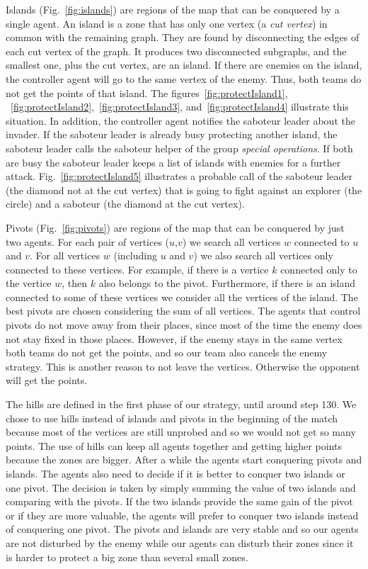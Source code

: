 Islands (Fig.~\ref{fig:islands}) are regions of the map that can be conquered by a single agent. An island is a zone that has only one vertex (a \emph{cut vertex}) in common with the remaining graph. They are found by disconnecting the edges of each cut vertex of the graph. It produces two disconnected subgraphs, and the smallest one, plus the cut vertex, are an island. If there are enemies on the island, the controller agent will go to the same vertex of the enemy. Thus, both teams do not get the points of that island. The figures~\ref{fig:protectIsland1}, ~\ref{fig:protectIsland2},~\ref{fig:protectIsland3}, and~\ref{fig:protectIsland4} illustrate this situation. In addition, the controller agent notifies the saboteur leader about the invader. If the saboteur leader is already busy protecting another island, the saboteur leader calls the saboteur helper of the group \emph{special operations}. If both are busy the saboteur leader keeps a list of islands with enemies for a further attack. Fig.~\ref{fig:protectIsland5} illustrates a probable call of the saboteur leader (the diamond not at the cut vertex) that is going to fight against an explorer (the circle) and a saboteur (the diamond at the cut vertex).

Pivots (Fig.~\ref{fig:pivots}) are regions of the map that can be conquered by just two agents. For each pair of vertices ($u$,$v$) we search all vertices $w$ connected to $u$ and $v$. For all vertices $w$ (including $u$ and $v$) we also search all vertices only connected to these vertices. For example, if there is a vertice $k$ connected only to the vertice $w$, then $k$ also belongs to the pivot. Furthermore, if there is an island connected to some of these vertices we consider all the vertices of the island. The best pivots are chosen considering the sum of all vertices. The agents that control pivots do not move away from their places, since most of the time the enemy does not stay fixed in those places. However, if the enemy stays in the same vertex both teams do not get the points, and so our team also cancels the enemy strategy. This is another reason to not leave the vertices. Otherwise the opponent will get the points.

The hills are defined in the first phase of our strategy, until around step 130. We chose to use hills instead of islands and pivots in the beginning of the match because most of the vertices are still unprobed and so we would not get so many points. The use of hills can keep all agents together and getting higher points because the zones are bigger. After a while the agents start conquering pivots and islands. The agents also need to decide if it is better to conquer two islands or one pivot. The decision is taken by simply summing the value of two islands and comparing with the pivots. If the two islands provide the same gain of the pivot or if they are more valuable, the agents will prefer to conquer two islands instead of conquering one pivot. The pivots and islands are very stable and so our agents are not disturbed by the enemy while our agents can disturb their zones since it is harder to protect a big zone than several small zones. 

